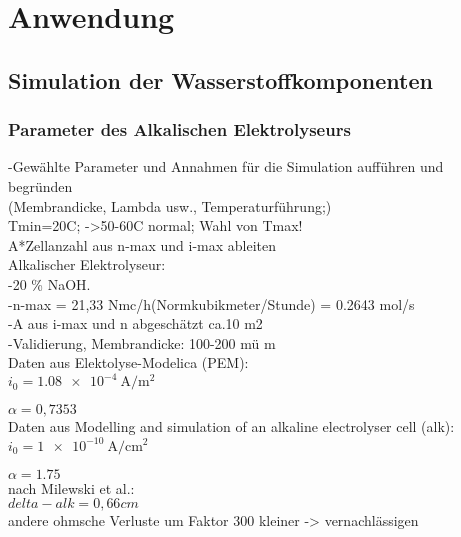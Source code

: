 \chapter{Anwendung}
\label{cha:Anwendung}

\section{Simulation der Wasserstoffkomponenten}

\subsection{Parameter des Alkalischen Elektrolyseurs}
-Gewählte Parameter und Annahmen für die Simulation aufführen und begründen\\
(Membrandicke, Lambda usw., Temperaturführung;)\\
Tmin=20C; ->50-60C normal; Wahl von Tmax!\\
A*Zellanzahl aus n-max und i-max ableiten\\

Alkalischer Elektrolyseur:\\
-20 \% NaOH.\\
-n-max = 21,33 Nmc/h(Normkubikmeter/Stunde) = 0.2643 mol/s \\
-A aus i-max und n abgeschätzt ca.10 m2\\



-Validierung, Membrandicke: 100-200 mü m \cite{rashid - Hydrogen Production by Water Electrolysis: A
Review of Alkaline Water Electrolysis, PEM Water
Electrolysis and High Temperature Water
Electrolysis}\\


Daten aus Elektolyse-Modelica (PEM):\\
$i_0 = \SI{1,08e-4}{\A\per\m\squared}$

$\alpha = 0,7353$\\

Daten aus Modelling and simulation of an alkaline electrolyser cell (alk):\\
$i_0 = \SI{1e-10}{\A\per\cm\squared}$

$\alpha = 1.75$\\

nach Milewski et al.:\\
$delta-alk = 0,66cm$\\
andere ohmsche Verluste um Faktor 300 kleiner -> vernachlässigen\\ 

